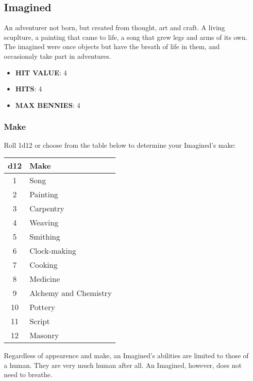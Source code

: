 \newpage
\subsection{Imagined}
An adventurer not born, but created from thought, art and craft. A living scuplture, a painting that came to life, a song that grew legs and arms of its own. The imagined were once objects but have the breath of life in them, and occasionaly take part in adventures.

\begin{multicols}{2}
    \begin{itemize}
      \item \textbf{HIT VALUE}: 4
      \item \textbf{HITS}: 4
      \item \textbf{MAX BENNIES}: 4
    \end{itemize}

    \subsubsection*{Make}
    Roll 1d12 or choose from the table below to determine your Imagined's make:
    
    \begin{adjustbox}{width=0.55\columnwidth,center}
    \begin{tabular}{|c|l|}
    \hline
    \textbf{d12} & \textbf{Make} \\
    \hline
    1 & Song \\
    2 & Painting \\
    3 & Carpentry \\
    4 & Weaving \\
    5 & Smithing \\
    6 & Clock-making \\
    7 & Cooking \\
    8 & Medicine \\
    9 & Alchemy and Chemistry \\
    10 & Pottery \\
    11 & Script \\
    12 & Masonry \\
    \hline
    \end{tabular}
    \end{adjustbox}
    
    Regardless of appearence and make, an Imagined's abilities are limited to those of a human. They are very much human after all. An Imagined, however, does not need to breathe.
    

\end{multicols}
